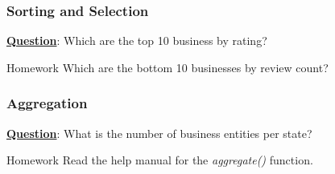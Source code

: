 \documentclass[12pt]{book}\usepackage{knitr}
\begin{document}
\subsubsection{Sorting and Selection}
\noindent \textbf{\underline{Question}}: Which are the top 10 business by rating? 
\begin{knitrout}
\color{fgcolor}\begin{kframe}
\begin{alltt}
\hlstd{(business[}\hlopt{$}
                     \hlstd{=} 
                    \hlstd{),}
              \hlstd{(}\hlstd{,}\hlstd{,}\hlstd{)}
              \hlstd{],}
     \hlstd{=}\hlstd{)}
\end{alltt}
\end{kframe}
\end{knitrout}

\begin{DIY}{Homework}
\noindent Which are the bottom 10 businesses by review count?
\end{DIY}

\subsubsection{Aggregation}
\noindent \textbf{\underline{Question}}: What is the number of business entities per state? 
\begin{knitrout}
\color{fgcolor}\begin{kframe}
\begin{alltt}
 \hlkwb{<-} \hlopt{$}
                           \hlstd{=}\hlopt{$}
                           \hlstd{)}
\hlkwb{<-}\hlstd{(}\hlstd{,}\hlstd{)}
\end{alltt}
\end{kframe}
\end{knitrout}


\begin{DIY}{Homework}
\noindent Read the help manual for the \emph{aggregate()} function.
\end{DIY}
\end{document}
